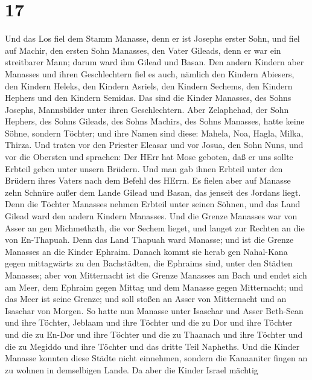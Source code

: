 \hypertarget{section-16}{%
\section{17}\label{section-16}}

 Und das Los fiel dem Stamm Manasse, denn er ist Josephs
erster Sohn, und fiel auf Machir, den ersten Sohn Manasses, den Vater
Gileads, denn er war ein streitbarer Mann; darum ward ihm Gilead und
Basan.  Den andern Kindern aber Manasses und ihren
Geschlechtern fiel es auch, nämlich den Kindern Abiesers, den Kindern
Heleks, den Kindern Asriels, den Kindern Sechems, den Kindern Hephers
und den Kindern Semidas. Das sind die Kinder Manasses, des Sohns
Josephs, Mannsbilder unter ihren Geschlechtern.  Aber
Zelaphehad, der Sohn Hephers, des Sohns Gileads, des Sohns Machirs, des
Sohns Manasses, hatte keine Söhne, sondern Töchter; und ihre Namen sind
diese: Mahela, Noa, Hagla, Milka, Thirza.  Und traten vor
den Priester Eleasar und vor Josua, den Sohn Nuns, und vor die Obersten
und sprachen: Der HErr hat Mose geboten, daß er uns sollte Erbteil geben
unter unsern Brüdern. Und man gab ihnen Erbteil unter den Brüdern ihres
Vaters nach dem Befehl des HErrn.  Es fielen aber auf
Manasse zehn Schnüre außer dem Lande Gilead und Basan, das jenseit des
Jordans liegt.  Denn die Töchter Manasses nehmen Erbteil
unter seinen Söhnen, und das Land Gilead ward den andern Kindern
Manasses.  Und die Grenze Manasses war von Asser an gen
Michmethath, die vor Sechem lieget, und langet zur Rechten an die von
En-Thapuah.  Denn das Land Thapuah ward Manasse; und ist die
Grenze Manasses an die Kinder Ephraim.  Danach kommt sie
herab gen Nahal-Kana gegen mittagwärts zu den Bachstädten, die Ephraims
sind, unter den Städten Manasses; aber von Mitternacht ist die Grenze
Manasses am Bach und endet sich am Meer,  dem Ephraim gegen
Mittag und dem Manasse gegen Mitternacht; und das Meer ist seine Grenze;
und soll stoßen an Asser von Mitternacht und an Isaschar von Morgen.
 So hatte nun Manasse unter Isaschar und Asser Beth-Sean
und ihre Töchter, Jeblaam und ihre Töchter und die zu Dor und ihre
Töchter und die zu En-Dor und ihre Töchter und die zu Thaanach und ihre
Töchter und die zu Megiddo und ihre Töchter und das dritte Teil
Napheths.  Und die Kinder Manasse konnten diese Städte
nicht einnehmen, sondern die Kanaaniter fingen an zu wohnen in
demselbigen Lande.  Da aber die Kinder Israel mächtig
